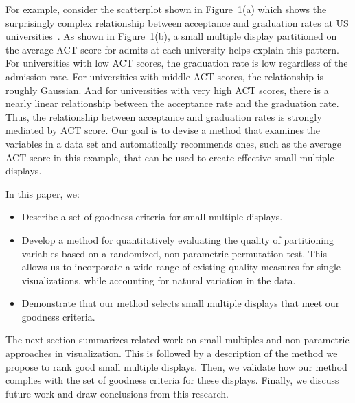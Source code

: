 For example, consider the scatterplot shown in Figure~1(a) which shows the surprisingly complex relationship between acceptance and graduation rates at US universities~\cite{IPEDS}. As shown in Figure~1(b), a small multiple display partitioned on the average ACT score for admits at each university helps explain this pattern.
For universities with low ACT scores, the graduation rate is low regardless of the admission rate.
For universities with middle ACT scores, the relationship is roughly Gaussian.
And for universities with very high ACT scores, there is a nearly linear relationship between the acceptance rate and the graduation rate.
Thus, the relationship between acceptance and graduation rates is strongly mediated by ACT score.
Our goal is to devise a method that examines the variables in a data set and automatically recommends ones, such as the average ACT score in this example, that can be used to create effective small multiple displays.


In this paper, we:
\begin{itemize}
    \item Describe a set of goodness criteria for small multiple displays.
    \item Develop a method for quantitatively evaluating the quality of partitioning variables based on a randomized, non-parametric permutation test. This allows us to incorporate a wide range of existing quality measures for single visualizations, while accounting for natural variation in the data.
    \item Demonstrate that our method selects small multiple displays that meet our goodness criteria.
\end{itemize}

The next section summarizes related work on small multiples and non-parametric approaches in visualization. This is followed by a description of the method we propose to rank good small multiple displays. Then, we validate how our method complies with the set of goodness criteria for these displays. Finally, we discuss future work and draw conclusions from this research.

